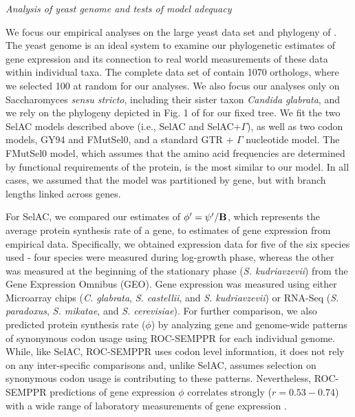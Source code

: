 \documentclass[12pt,letterpaper]{article}
\renewcommand{\subsection}[1]{%
\bigskip
\begin{center}
\begin{large}
\normalfont\itshape #1
\end{large}
\end{center}}
\newcommand{\Func}{\ensuremath{\text{\textbf{B}}}\xspace}
\newcommand{\selac}{SelAC\xspace}
\newcommand{\selacplusgamma}{SelAC$+\Gamma$\xspace}
\newcommand{\phiprime}{\ensuremath{\phi^\prime}\xspace}
\newcommand{\psiprime}{\ensuremath{\psi^\prime}\xspace}
\begin{document}
\subsection{Analysis of yeast genome and tests of model adequacy}
We focus our empirical analyses on the large yeast data set and phylogeny of \citet{SalichosAndRokas2013}.
The yeast genome is an ideal system to examine our phylogenetic estimates of gene expression and its connection to real world measurements of these data within individual taxa.
The complete data set of \citet{SalichosAndRokas2013} contain 1070 orthologs, where we selected 100 at random for our analyses.
We also focus our analyses only on Saccharomyces \emph{sensu stricto}, including their sister taxon \emph{Candida glabrata}, and we rely on the phylogeny depicted in Fig. 1 of \citet{SalichosAndRokas2013} for our fixed tree.
We fit the two \selac models described above (i.e., \selac and \selacplusgamma), as well as two codon models, GY94 and FMutSel0, and a standard GTR + $\Gamma$ nucleotide model.
The FMutSel0 model, which assumes that the amino acid frequencies are determined by functional requirements of the protein, is the most similar to our model.
In all cases, we assumed that the model was partitioned by gene, but with branch lengths linked across genes.

For \selac, we compared our estimates of $\phiprime = \psiprime/\Func$, which represents the average protein synthesis rate of a gene, to estimates of gene expression from empirical data.
Specifically, we obtained expression data for five of the six species used - four species were measured during log-growth phase, whereas the other was measured at the beginning of the stationary phase (\emph{S. kudriavzevii}) from the Gene Expression Omnibus (GEO).
Gene expression was measured using either Microarray chips (\emph{C. glabrata}, \emph{S. castellii}, and \emph{S. kudriavzevii}) or RNA-Seq (\emph{S. paradoxus}, \emph{S. mikatae}, and \emph{S. cerevisiae}).
For further comparison, we also predicted protein synthesis rate ($\phi$) by analyzing gene and genome-wide patterns of synonymous codon usage using ROC-SEMPPR \citep{GilchristEtAl2015} for each individual genome.
While, like \selac, ROC-SEMPPR uses codon level information, it does not rely on any inter-specific comparisons and, unlike \selac, assumes selection on synonymous codon usage is contributing to these patterns.
Nevertheless, ROC-SEMPPR predictions of gene expression $\phi$ correlates strongly ($r = 0.53-0.74$) with a wide range of laboratory measurements of gene expression \citep{GilchristEtAl2015}.
\end{document}
